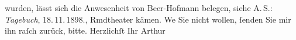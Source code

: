 \begin{ledgroupsized}[t]{13cm}
{{{                  wurden, lässt sich die Anwesenheit von Beer-Hofmann belegen, siehe A. S.: \emph{Tagebuch}, 18. 11. 1898.}}}\label{K_L00858_1h}, Rmdtheater kämen. We{\geminationn}{ }Sie nicht wollen, ſenden Sie mir ihn raſch zurück,
               bitte.\pend
           \pstart Herzlichſt Ihr \spacefill\mbox{Arthur}\pend{}          \endnumbering{}\end{ledgroupsized}  \newcommand{\dateiname}{L00858}\newcommand{\titel}{Arthur Schnitzler an Richard Beer-Hofmann, [18. 11. 1898?]}\newcommand{\editorInnen}{Martin Anton Müller und Gerd-Hermann Susen}
            \footnotesize
\begin{ledgroupsized}[t]{11.5cm}
\end{ledgroupsized}
         
      